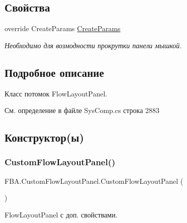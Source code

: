 \subsection*{Свойства}
\begin{DoxyCompactItemize}
\item 
override Create\+Params \mbox{\hyperlink{class_f_b_a_1_1_custom_flow_layout_panel_ab269fa7ae2953783f088921af3cc9088}{Create\+Params}}
\begin{DoxyCompactList}\small\item\em Необходимо для возмодности прокрутки панели мышкой. \end{DoxyCompactList}\end{DoxyCompactItemize}


\subsection{Подробное описание}
Класс потомок Flow\+Layout\+Panel. 



См. определение в файле Sys\+Comp.\+cs строка 2883



\subsection{Конструктор(ы)}
\mbox{\label{class_f_b_a_1_1_custom_flow_layout_panel_a3bd23c3f6237edd4ab450ef8ca18536c}} 
\subsubsection{\texorpdfstring{Custom\+Flow\+Layout\+Panel()}{CustomFlowLayoutPanel()}}
{\footnotesize\ttfamily F\+B\+A.\+Custom\+Flow\+Layout\+Panel.\+Custom\+Flow\+Layout\+Panel (\begin{DoxyParamCaption}{ }\end{DoxyParamCaption})}



Flow\+Layout\+Panel с доп. свойствами. 



